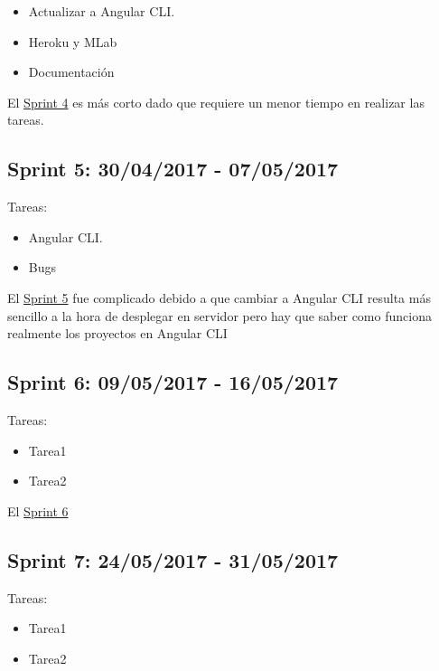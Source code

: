 \begin{itemize}
	\item Actualizar a Angular CLI.
	\item Heroku y MLab
	\item Documentación
\end{itemize}


El \underline{Sprint 4} es más corto dado que requiere un menor tiempo en realizar las tareas.

\subsection{Sprint 5: 30/04/2017 - 07/05/2017}\label{sprint5}

Tareas:

\begin{itemize}
	\item Angular CLI.
	\item Bugs
\end{itemize}


El \underline{Sprint 5} fue complicado debido a que cambiar a Angular CLI resulta más sencillo a la hora de desplegar en servidor pero hay que saber como funciona realmente los proyectos en Angular CLI

\subsection{Sprint 6: 09/05/2017 - 16/05/2017}\label{sprint6}

Tareas:

\begin{itemize}
	\item Tarea1
	\item Tarea2
\end{itemize}


El \underline{Sprint 6} 

\subsection{Sprint 7: 24/05/2017 - 31/05/2017}\label{sprint6}

Tareas:

\begin{itemize}
	\item Tarea1
	\item Tarea2
\end{itemize}


